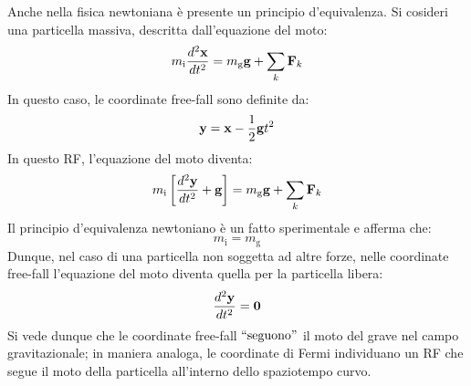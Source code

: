 Anche nella fisica newtoniana è presente un principio d'equivalenza. Si cosideri una particella massiva, descritta dall'equazione del moto:
\begin{equation}
	m_{\text{i}} \frac{d^2 \mathbf{x}}{dt^2} = m_{\text{g}} \mathbf{g} + \sum_{k} \mathbf{F}_k
	\label{eq:5.20}
\end{equation}
In questo caso, le coordinate free-fall sono definite da:
\begin{equation}
	\mathbf{y} = \mathbf{x} - \frac{1}{2} \mathbf{g} t^2
	\label{eq:5.21}
\end{equation}
In questo RF, l'equazione del moto diventa:
\begin{equation}
	m_{\text{i}} \left[ \frac{d^2\mathbf{y}}{dt^2} + \mathbf{g} \right] = m_{\text{g}} \mathbf{g} + \sum_{k} \mathbf{F}_k
	\label{eq:5.22}
\end{equation}
Il principio d'equivalenza newtoniano è un fatto sperimentale e afferma che:
\begin{equation}
	m_{\text{i}} = m_{\text{g}}
	\label{eq:5.23}
\end{equation}
Dunque, nel caso di una particella non soggetta ad altre forze, nelle coordinate free-fall l'equazione del moto diventa quella per la particella libera:
\begin{equation}
	\frac{d^2 \mathbf{y}}{dt^2} = \mathbf{0}
	\label{eq:5.24}
\end{equation}
Si vede dunque che le coordinate free-fall $ ``\text{seguono}" $ il moto del grave nel campo gravitazionale; in maniera analoga, le coordinate di Fermi individuano un RF che segue il moto della particella all'interno dello spaziotempo curvo.










